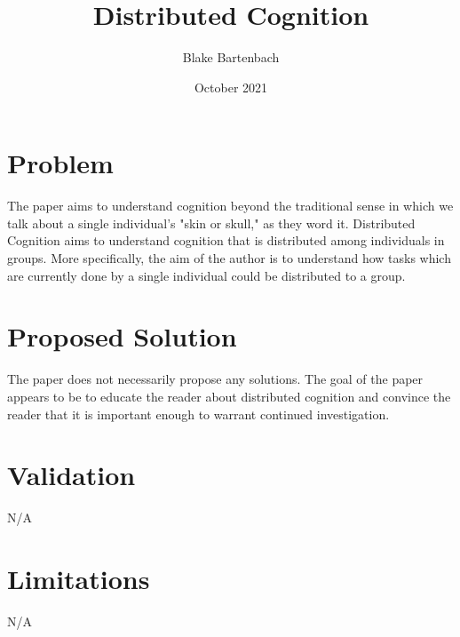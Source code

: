 \documentclass{article}
\title{Distributed Cognition}
\author{Blake Bartenbach}
\date{October 2021}
\begin{document}
\maketitle

\section{Problem}
The paper aims to understand cognition beyond the traditional sense in which we talk about a single individual's "skin or skull," as they word it. Distributed Cognition aims to understand cognition that is distributed among individuals in groups. More specifically, the aim of the author is to understand how tasks which are currently done by a single individual could be distributed to a group.

\section{Proposed Solution}
The paper does not necessarily propose any solutions. The goal of the paper appears to be to educate the reader about distributed cognition and convince the reader that it is important enough to warrant continued investigation.

\section{Validation}
N/A

\section{Limitations}
N/A



\end{document}
